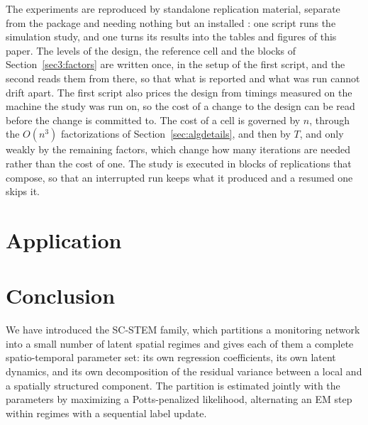 The experiments are reproduced by standalone replication material, separate from the package and needing nothing but an installed \Stem{}: one script runs the simulation study, and one turns its results into the tables and figures of this paper. The levels of the design, the reference cell and the blocks of Section~\ref{sec3:factors} are written once, in the setup of the first script, and the second reads them from there, so that what is reported and what was run cannot drift apart. The first script also prices the design from timings measured on the machine the study was run on, so the cost of a change to the design can be read before the change is committed to. The cost of a cell is governed by $n$, through the $O(n^3)$ factorizations of Section~\ref{sec:algdetails}, and then by $T$, and only weakly by the remaining factors, which change how many iterations are needed rather than the cost of one. The study is executed in blocks of replications that compose, so that an interrupted run keeps what it produced and a resumed one skips it.

\section{Application}\label{sec4}


\section{Conclusion}\label{sec5}

We have introduced the SC-STEM family, which partitions a monitoring network into a small number of latent spatial regimes and gives each of them a complete spatio-temporal parameter set: its own regression coefficients, its own latent dynamics, and its own decomposition of the residual variance between a local and a spatially structured component. The partition is estimated jointly with the parameters by maximizing a Potts-penalized likelihood, alternating an EM step within regimes with a sequential label update.

